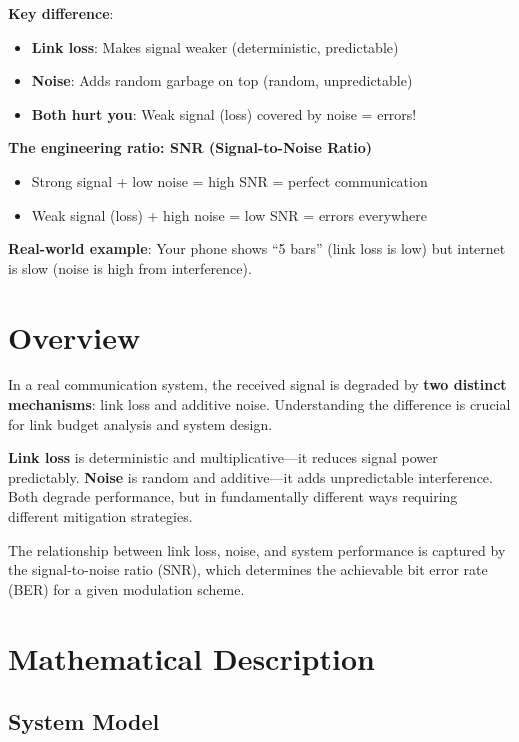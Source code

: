 \begin{nontechnical}
\textbf{Key difference}:
\begin{itemize}
\item \textbf{Link loss}: Makes signal weaker (deterministic, predictable)
\item \textbf{Noise}: Adds random garbage on top (random, unpredictable)
\item \textbf{Both hurt you}: Weak signal (loss) covered by noise = errors!
\end{itemize}

\textbf{The engineering ratio: SNR (Signal-to-Noise Ratio)}
\begin{itemize}
\item Strong signal + low noise = high SNR = perfect communication
\item Weak signal (loss) + high noise = low SNR = errors everywhere
\end{itemize}

\textbf{Real-world example}: Your phone shows ``5 bars'' (link loss is low) but internet is slow (noise is high from interference).
\end{nontechnical}

\section{Overview}

In a real communication system, the received signal is degraded by \textbf{two distinct mechanisms}: link loss and additive noise. Understanding the difference is crucial for link budget analysis and system design.

\begin{keyconcept}
\textbf{Link loss} is deterministic and multiplicative---it reduces signal power predictably. \textbf{Noise} is random and additive---it adds unpredictable interference. Both degrade performance, but in fundamentally different ways requiring different mitigation strategies.
\end{keyconcept}

The relationship between link loss, noise, and system performance is captured by the signal-to-noise ratio (SNR), which determines the achievable bit error rate (BER) for a given modulation scheme.

\section{Mathematical Description}

\subsection{System Model}

